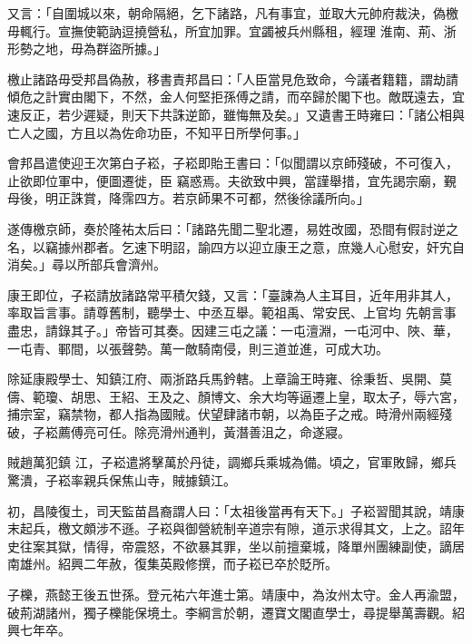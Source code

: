 \begin{pinyinscope}
 又言：「自圍城以來，朝命隔絕，乞下諸路，凡有事宜，並取大元帥府裁決，偽檄毋輒行。宣撫使範訥逗撓營私，所宜加罪。宜蠲被兵州縣租，經理
 淮南、荊、浙形勢之地，毋為群盜所據。」



 檄止諸路毋受邦昌偽赦，移書責邦昌曰：「人臣當見危致命，今議者籍籍，謂劫請傾危之計實由閣下，不然，金人何堅拒孫傅之請，而卒歸於閣下也。敵既遠去，宜速反正，若少遲疑，則天下共誅逆節，雖悔無及矣。」又遺書王時雍曰：「諸公相與亡人之國，方且以為佐命功臣，不知平日所學何事。」



 會邦昌遣使迎王次第白子崧，子崧即貽王書曰：「似聞謂以京師殘破，不可復入，止欲即位軍中，便圖遷徙，臣
 竊惑焉。夫欲致中興，當謹舉措，宜先謁宗廟，覲母後，明正誅賞，降霈四方。若京師果不可都，然後徐議所向。」



 遂傳檄京師，奏於隆祐太后曰：「諸路先聞二聖北遷，易姓改國，恐間有假討逆之名，以竊據州郡者。乞速下明詔，諭四方以迎立康王之意，庶幾人心慰安，奸宄自消矣。」尋以所部兵會濟州。



 康王即位，子崧請放諸路常平積欠錢，又言：「臺諫為人主耳目，近年用非其人，率取旨言事。請尊舊制，聽學士、中丞互舉。範祖禹、常安民、上官均
 先朝言事盡忠，請錄其子。」帝皆可其奏。因建三屯之議：一屯澶淵，一屯河中、陜、華，一屯青、鄆間，以張聲勢。萬一敵騎南侵，則三道並進，可成大功。



 除延康殿學士、知鎮江府、兩浙路兵馬鈐轄。上章論王時雍、徐秉哲、吳開、莫儔、範瓊、胡思、王紹、王及之、顏博文、余大均等逼遷上皇，取太子，辱六宮，捕宗室，竊禁物，都人指為國賊。伏望肆諸市朝，以為臣子之戒。時滑州兩經殘破，子崧薦傅亮可任。除亮滑州通判，黃潛善沮之，命遂寢。



 賊趙萬犯鎮
 江，子崧遣將擊萬於丹徒，調鄉兵乘城為備。頃之，官軍敗歸，鄉兵驚潰，子崧率親兵保焦山寺，賊據鎮江。



 初，昌陵復土，司天監苗昌裔謂人曰：「太祖後當再有天下。」子崧習聞其說，靖康末起兵，檄文頗涉不遜。子崧與御營統制辛道宗有隙，道示求得其文，上之。詔年史往案其獄，情得，帝震怒，不欲暴其罪，坐以前擅棄城，降單州團練副使，謫居南雄州。紹興二年赦，復集英殿修撰，而子崧已卒於貶所。



 子櫟，燕懿王後五世孫。登元祐六年進士第。靖康中，為汝州太守。金人再渝盟，破荊湖諸州，獨子櫟能保境土。李綱言於朝，遷寶文閣直學士，尋提舉萬壽觀。紹興七年卒。




\end{pinyinscope}
